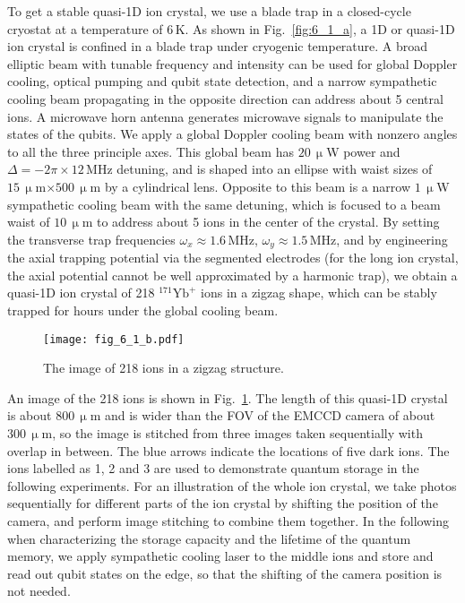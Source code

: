 To get a stable quasi-1D ion crystal, we use a blade trap in a closed-cycle cryostat \cite{pagano2018cryogenic} at a temperature of $6\,$K. As shown in Fig.~\ref{fig:6_1_a}, a 1D or quasi-1D ion crystal is confined in a blade trap under cryogenic temperature. A broad elliptic beam with tunable frequency and intensity can be used for global Doppler cooling, optical pumping and qubit state detection, and a narrow sympathetic cooling beam propagating in the opposite direction can address about 5 central ions. A microwave horn antenna generates microwave signals to manipulate the states of the qubits. We apply a global Doppler cooling beam with nonzero angles to all the three principle axes. This global beam has $20\,\upmu$W power and $\Delta=-2\pi\times 12\,$MHz detuning, and is shaped into an ellipse with waist sizes of $15\,\upmu$m$\times 500\,\upmu$m by a cylindrical lens. Opposite to this beam is a narrow $1\,\upmu$W sympathetic cooling beam with the same detuning, which is focused to a beam waist of $10\,\upmu$m to address about 5 ions in the center of the crystal. By setting the transverse trap frequencies $\omega_x\approx 1.6\,$MHz, $\omega_y\approx 1.5\,$MHz, and by engineering the axial trapping potential via the segmented electrodes (for the long ion crystal, the axial potential cannot be well approximated by a harmonic trap), we obtain a quasi-1D ion crystal of 218 $^{171}\mathrm{Yb}^+$ ions in a zigzag shape, which can be stably trapped for hours under the global cooling beam.

\begin{figure}
    \centering
    \texttt{[image: fig\_6\_1\_b.pdf]}
    \caption{The image of 218 ions in a zigzag structure.}
    \label{fig:6_1_b}
\end{figure}

An image of the 218 ions is shown in Fig.~\ref{fig:6_1_b}. The length of this quasi-1D crystal is about $800\,\upmu$m and is wider than the FOV of the EMCCD camera of about $300\,\upmu$m, so the image is stitched from three images taken sequentially with overlap in between. The blue arrows indicate the locations of five dark ions. The ions labelled as 1, 2 and 3 are used to demonstrate quantum storage in the following experiments. For an illustration of the whole ion crystal, we take photos sequentially for different parts of the ion crystal by shifting the position of the camera, and perform image stitching to combine them together. In the following when characterizing the storage capacity and the lifetime of the quantum memory, we apply sympathetic cooling laser to the middle ions \cite{mao2021experimental} and store and read out qubit states on the edge, so that the shifting of the camera position is not needed.



